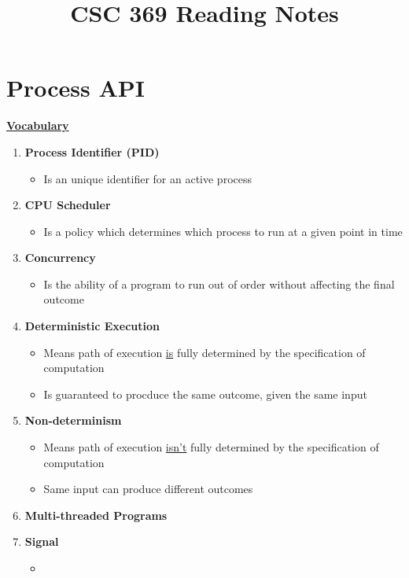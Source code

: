 \documentclass[12pt]{article}
\begin{document}
\title{CSC 369 Reading Notes}

\section{Process API}

\begin{mdframed}
\underline{\textbf{Vocabulary}}

\bigskip

\begin{enumerate}[1.]
    \item \textbf{Process Identifier (PID)}
    \begin{itemize}
        \item Is an unique identifier for an active process
    \end{itemize}
    \item \textbf{CPU Scheduler}
    \begin{itemize}
        \item Is a policy which determines which process to run at a given point in time
    \end{itemize}
    \item \textbf{Concurrency}
    \begin{itemize}
        \item Is the ability of a program to run out of order without affecting the final outcome
    \end{itemize}
    \item \textbf{Deterministic Execution}
    \begin{itemize}
        \item Means path of execution \underline{is} fully determined by the specification of computation
        \item Is guaranteed to procduce the same outcome, given the same input
    \end{itemize}
    \item \textbf{Non-determinism}
    \begin{itemize}
        \item Means path of execution \underline{isn't} fully determined by the specification of computation
        \item Same input can produce different outcomes
    \end{itemize}
    \item \textbf{Multi-threaded Programs}
    \item \textbf{Signal}
    \begin{itemize}
        \item
    \end{itemize}
\end{enumerate}

\end{mdframed}
\end{document}
